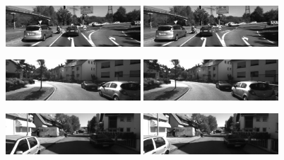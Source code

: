 \documentclass[11pt, a4paper]{article}
\begin{document}
\begin{figure}[h!]
  \begin{center}         
    \includegraphics[width=0.45\textwidth]{stereo_images/images0/kitti_4_left}
    \includegraphics[width=0.45\textwidth]{stereo_images/images1/kitti_4_right}
\end{center}
\end{figure}  
    
 \begin{figure}[h!]
  \begin{center}  
    \includegraphics[width=0.45\textwidth]{stereo_images/images0/kitti_5_left}
    \includegraphics[width=0.45\textwidth]{stereo_images/images1/kitti_5_right}
\end{center}
\end{figure}  

    
\begin{figure}[h!]
  \begin{center}  
    \includegraphics[width=0.45\textwidth]{stereo_images/images0/kitti_6_left}
    \includegraphics[width=0.45\textwidth]{stereo_images/images1/kitti_6_right}
\end{center}
\end{figure}  
    
\end{document}
